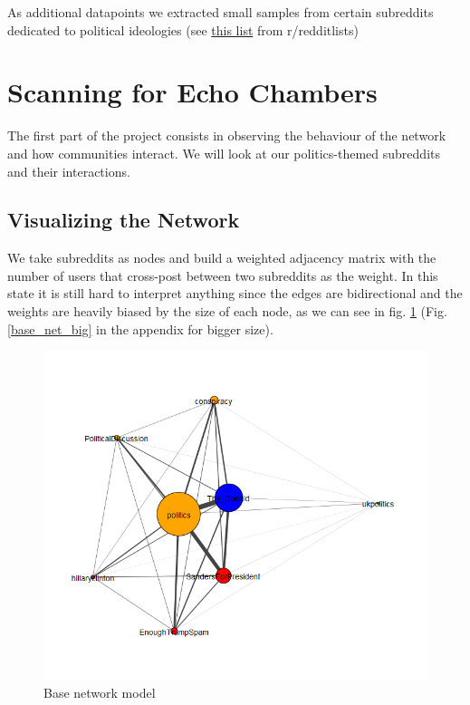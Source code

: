 \documentclass[11pt]{article}
\begin{document}
As additional datapoints we extracted small samples from certain subreddits dedicated to political ideologies (see \href{https://www.reddit.com/r/redditlists/comments/josdr/list_of_political_subreddits/}{this list} from r/redditlists)	

\section{Scanning for Echo Chambers}

The first part of the project consists in observing the behaviour of the network and how communities interact. We will look at our politics-themed subreddits and their interactions.

\subsection{Visualizing the Network}
We take subreddits as nodes and build a weighted adjacency matrix with the number of users that cross-post between two subreddits as the weight. In this state it is still hard to interpret anything since the edges are bidirectional and the weights are heavily biased by the size of each node, as we can see in fig. \ref{base_net} (Fig. \ref{base_net_big} in the appendix for bigger size).

\begin{figure}[h]
	\includegraphics[width=\columnwidth]{img/base_network.png}
	\caption{\label{base_net} Base network model}
\end{figure}
 
\end{document}
